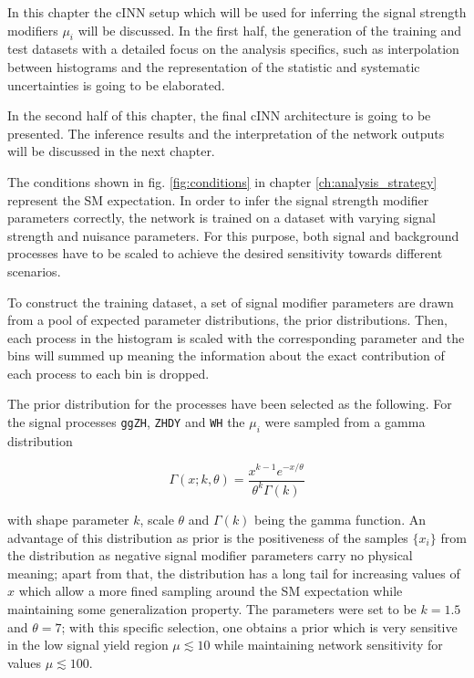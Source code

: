 
In this chapter the cINN setup which will be used for inferring the signal strength modifiers $\mu_i$ will be discussed. In the first half, the generation of the training and test datasets with a detailed focus on the analysis specifics, such as interpolation between histograms and the representation of the statistic and systematic uncertainties is going to be elaborated.

In the second half of this chapter, the final cINN architecture is going to be presented. The inference results and the interpretation of the network outputs will be discussed in the next chapter.


The conditions shown in fig. \ref{fig:conditions} in chapter \ref{ch:analysis_strategy} represent the SM expectation. In order to infer the signal strength modifier parameters correctly, the network is trained on a dataset with varying signal strength and nuisance parameters. For this purpose, both signal and background processes have to be scaled to achieve the desired sensitivity towards different scenarios.


To construct the training dataset, a set of signal modifier parameters are drawn from a pool of expected parameter distributions, the prior distributions. Then, each process in the histogram is scaled with the corresponding parameter and the bins will summed up meaning the information about the exact contribution of each process to each bin is dropped.

The prior distribution for the processes have been selected as the following. For the signal processes \texttt{ggZH}, \texttt{ZHDY} and \texttt{WH} the $\mu_i$ were sampled from a gamma distribution

\begin{equation*}
	\Gamma(x; k, \theta) = \frac{x^{k-1}e^{-x/\theta}}{\theta^k\Gamma(k)}
\end{equation*}

with shape parameter $k$, scale $\theta$ and $\Gamma(k)$ being the gamma function. An advantage of this distribution as prior is the positiveness of the samples $\{x_i\}$ from the distribution as negative signal modifier parameters carry no physical meaning; apart from that, the distribution has a long tail for increasing values of $x$ which allow a more fined sampling around the SM expectation while maintaining some generalization property. The parameters were set to be $k = 1.5$ and $\theta = 7$; with this specific selection, one obtains a prior which is very sensitive in the low signal yield region $\mu \lesssim 10$ while maintaining network sensitivity for values $\mu\lesssim100$.

